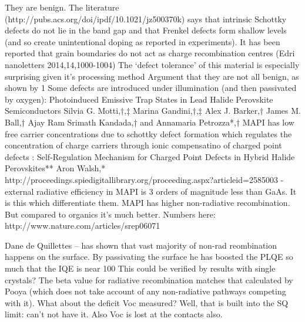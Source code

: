 They are benign. The literature (http://pubs.acs.org/doi/ipdf/10.1021/jz500370k) says that intrinsic Schottky defects do not lie in the band gap and that Frenkel defects form shallow levels (and so create unintentional doping as reported in experiments). 
It has been reported that grain boundaries do not act as charge recombination centres (Edri nanoletters 2014,14,1000-1004)
The `defect tolerance’ of this material is especially surprising given it’s processing method
Argument that they are not all benign, as shown by 1%
Some defects are introduced under illumination (and then passivated by oxygen): Photoinduced Emissive Trap States in Lead Halide Perovskite Semiconductors Silvia G. Motti,†,‡ Marina Gandini,†,‡ Alex J. Barker,† James M. Ball,† Ajay Ram Srimath Kandada,† and Annamaria Petrozza*,† 
MAPI has low free carrier concentrations due to schottky defect formation which regulates the concentration of charge carriers through ionic compensatino of charged point defects : Self-Regulation Mechanism for Charged Point Defects in Hybrid Halide Perovskites** Aron Walsh,* 
http://proceedings.spiedigitallibrary.org/proceeding.aspx?articleid=2585003 - external radiative efficiency in MAPI is 3 orders of magnitude less than GaAs. It is this which differentiate them. MAPI has higher non-radiative recombination. But compared to organics it’s much better. Numbers here: http://www.nature.com/articles/srep06071

Dane de Quillettes – has shown that vast majority of non-rad reombination happens on the surface. By passivating the surface he has boosted the PLQE so much that the IQE is near 100%
This could be verified by results with single crystals?
The beta value for radiative recombination matches that calculated by Pooya (which does not take account of any non-radiative pathways competing with it).
What about the deficit Voc measured? Well, that is built into the SQ limit: can’t not have it. Also Voc is lost at the contacts also.
